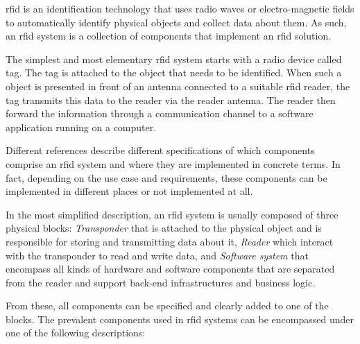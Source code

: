 
\ac{rfid} is an identification technology that uses radio waves or electro-magnetic fields to automatically identify physical objects and collect data about them.
As such, an \ac{rfid} system is a collection of components that implement an \ac{rfid} solution.

The simplest and most elementary \ac{rfid} system starts with a radio device called tag. The tag is attached to the object that needs to be identified. When such a object is presented in front of an antenna connected to a suitable \ac{rfid} reader, the tag transmits this data to the reader via the reader antenna. The reader then forward the information through a communication channel to a software application running on a computer.

Different references describe different specifications of which components comprise an \ac{rfid} system and where they are implemented in concrete terms.
In fact, depending on the use case and requirements, these components can be implemented in different places or not implemented at all.

In the most simplified description, an \ac{rfid} system is usually composed of three physical blocks: \emph{Transponder} that is attached to the physical object and is responsible for storing and transmitting data about it, \emph{Reader} which interact with the transponder to read and write data, and \emph{Software system} that encompass all kinds of hardware and software components that are separated from the reader and support back-end infrastructures and business logic.

From these, all components can be specified and clearly added to one of the blocks.
The prevalent components used in \ac{rfid} systems can be encompassed under one of the following descriptions:

